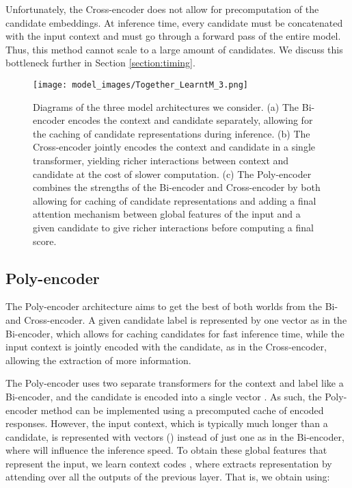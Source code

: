 \documentclass{article} \usepackage{iclr2020_conference,times}
\begin{document}
Unfortunately, the Cross-encoder does not allow for precomputation of the candidate embeddings. At inference time, every candidate must be concatenated with the input context and must go through a forward pass of the entire model. Thus, this method cannot scale to a large amount of candidates. We discuss this bottleneck further in Section \ref{section:timing}.
\begin{figure}[t]
    \center
  \texttt{[image: model\_images/Together\_LearntM\_3.png]}
  \caption{Diagrams of the three model architectures we consider. (a) The Bi-encoder encodes the context and candidate separately, allowing for the caching of candidate representations during inference. (b) The Cross-encoder jointly encodes the context and candidate in a single transformer, yielding richer interactions between context and candidate at the cost of slower computation. (c) The Poly-encoder combines the strengths of the Bi-encoder and Cross-encoder by both allowing for caching of candidate representations and adding a final attention mechanism between global features of the input and a given candidate to give richer interactions
before computing a final score.}
  \label{architectures}
\end{figure}

\subsection{Poly-encoder}



\label{subsection:Poly_Encoder}
The Poly-encoder architecture aims to get the best of both worlds from the Bi- and  Cross-encoder. A given candidate label is represented by one vector as in the Bi-encoder, which allows for caching candidates for fast inference time, while the input context is jointly encoded with the candidate, as in the Cross-encoder, allowing the extraction of more information.


The Poly-encoder uses two separate transformers for the context and label like a Bi-encoder, and the candidate is encoded into a single vector . As such, the Poly-encoder method can be implemented using a precomputed cache of encoded responses. However, the input context, which is typically much longer than a candidate, is represented with  vectors () instead of just one as in the Bi-encoder, where  will influence the inference speed.  
To obtain these  global features that represent the input, we learn  context codes , where  extracts representation  by attending over all the outputs of the previous layer. That is, we obtain  using: 
\end{document}
